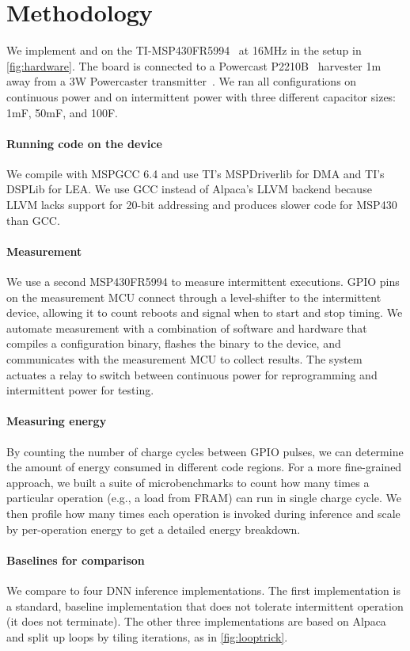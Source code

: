 \section{Methodology}
\label{sec:methodology}

We implement \sonic and \tails on the TI-MSP430FR5994~\cite{msp430fr5994} at
16MHz in the setup in \autoref{fig:hardware}.
The board is connected to a
Powercast P2210B~\cite{powercastboard} harvester 1m away from a 3W Powercaster
transmitter~\cite{powercasttransmitter}. We ran all configurations on
continuous power and on intermittent power with three different capacitor
sizes: 1mF, 50mF, and 100\textmu F.

\figMethod

\figEvalTime

\paragraph{Running code on the device}
We compile with MSPGCC 6.4 and use TI's MSPDriverlib for DMA and TI's DSPLib
for LEA. We use GCC instead of Alpaca's LLVM backend because LLVM lacks support
for 20-bit addressing and produces slower code for MSP430 than GCC.

\paragraph{Measurement}
We use a second MSP430FR5994 to measure intermittent executions.
%
GPIO pins on the measurement MCU connect through a level-shifter to the
intermittent device, allowing it to count reboots and signal when to start and
stop timing.
%
We automate measurement with a combination of software and hardware that
compiles a configuration binary, flashes the binary to the device, and
communicates with the measurement MCU to collect results.
%
The system actuates a relay to switch between continuous power for reprogramming
and intermittent power for testing.

\paragraph{Measuring energy}
By counting the number of charge cycles between GPIO pulses, we can determine
the amount of energy consumed in different code regions.
%
For a more fine-grained approach, we built a suite of 
microbenchmarks to count how many times a particular operation (e.g., a load from FRAM) can run in single charge cycle.
%
We then profile how many times each operation is invoked during inference
and scale by per-operation energy to get a detailed energy breakdown.

\paragraph{Baselines for comparison}
We compare \sonictails to four DNN inference implementations. The first
implementation is a standard, baseline implementation that does not tolerate
intermittent operation (it does not terminate).
The other three implementations are based on
Alpaca~\cite{alpaca} and split up loops by tiling iterations, as in \autoref{fig:looptrick}.

